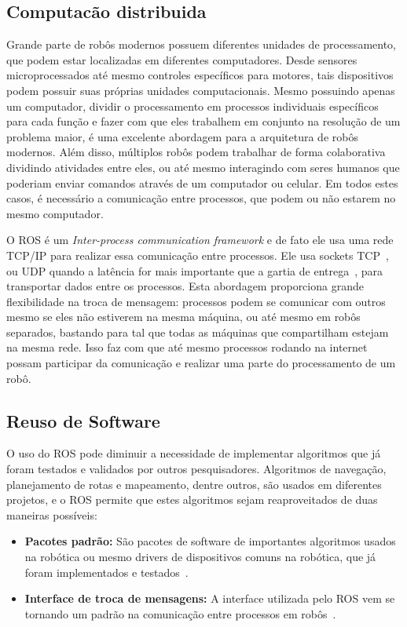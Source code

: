 \subsection{Computacão distribuida}
Grande parte de robôs modernos possuem diferentes unidades de processamento, que podem estar localizadas em diferentes computadores. Desde sensores microprocessados até mesmo controles específicos para motores, tais dispositivos podem possuir suas próprias unidades computacionais. Mesmo possuindo apenas um computador, dividir o processamento em processos individuais específicos para cada função e fazer com que eles trabalhem em conjunto na resolução de um problema maior, é uma excelente abordagem para a arquitetura de robôs modernos. Além disso, múltiplos robôs podem trabalhar de forma colaborativa dividindo atividades entre eles, ou até mesmo interagindo com seres humanos que poderiam enviar comandos através de um computador ou celular. Em todos estes casos, é necessário a comunicação entre processos, que podem ou não estarem no mesmo computador. 

O ROS é um \textit{Inter-process communication framework} e de fato ele usa uma rede TCP/IP para realizar essa comunicação entre processos. Ele usa sockets TCP~\cite{RosTCP}, ou UDP quando a latência for mais importante que a gartia de entrega~\cite{RosUDP}, para transportar dados entre os processos. Esta abordagem proporciona grande flexibilidade na troca de mensagem: processos podem se comunicar com outros mesmo se eles não estiverem na mesma máquina, ou até mesmo em robôs separados, bastando para tal que todas as máquinas que compartilham estejam na mesma rede. Isso faz com que até mesmo processos rodando na internet possam participar da comunicação e realizar uma parte do processamento de um robô.


\subsection{Reuso de Software}
O uso do ROS pode diminuir a necessidade de implementar algoritmos que já foram testados e validados por outros pesquisadores. Algoritmos de navegação, planejamento de rotas e mapeamento, dentre outros, são usados em diferentes projetos, e o ROS permite que estes algoritmos sejam reaproveitados de duas maneiras possíveis:

\begin{itemize}
    \item \textbf{Pacotes padrão:} São pacotes de software de importantes algoritmos usados na robótica ou mesmo drivers de dispositivos comuns na robótica, que já foram implementados e testados~\cite{rosgentle}.

    \item \textbf{Interface de troca de mensagens:} A interface utilizada pelo ROS vem se tornando um padrão na comunicação entre processos em robôs~\cite{rosgentle}.
\end{itemize}

